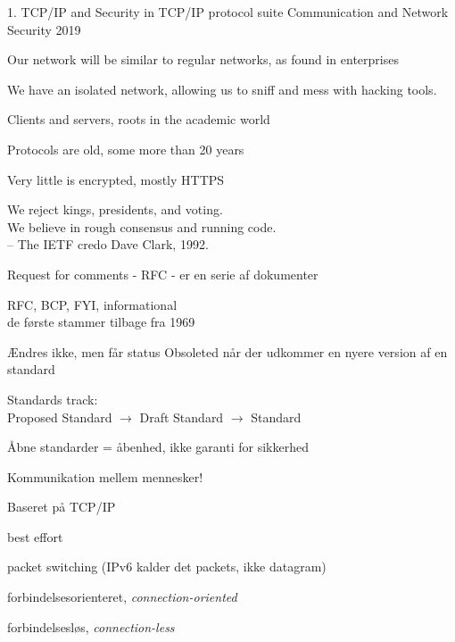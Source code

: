 \documentclass[Screen16to9,17pt]{foils}
\begin{document}
\mytitlepage
{1. TCP/IP and Security in TCP/IP protocol suite}
{Communication and Network Security 2019}



\begin{list1}
\item Our network will be similar to regular networks, as found in enterprises
\item We have an isolated network, allowing us to sniff and mess with hacking tools.
\end{list1}



\begin{list1}
\item Clients and servers, roots in the academic world
\item Protocols are old, some more than 20 years
\item Very little is encrypted, mostly HTTPS
\end{list1}


{\hlkbig \color{titlecolor}
We reject kings, presidents, and voting.\\
We believe in rough consensus and running code.\\
-- The IETF credo Dave Clark, 1992.}

\begin{list1}
\item Request for comments - RFC - er en serie af dokumenter
\item RFC, BCP, FYI, informational\\
de første stammer tilbage fra 1969
\item Ændres ikke, men får status Obsoleted når der udkommer en nyere
  version af en standard
\item Standards track:\\
Proposed Standard $\rightarrow$ Draft Standard $\rightarrow$ Standard
\item  Åbne standarder = åbenhed, ikke garanti for sikkerhed
\end{list1}


\begin{list1}
\item Kommunikation mellem mennesker!
\item Baseret på TCP/IP
\begin{list2}
\item best effort
\item packet switching (IPv6 kalder det packets, ikke datagram)
\item forbindelsesorienteret, \emph{connection-oriented}
\item forbindelsesløs, \emph{connection-less}
\end{list2}
\end{list1}
\end{document}
